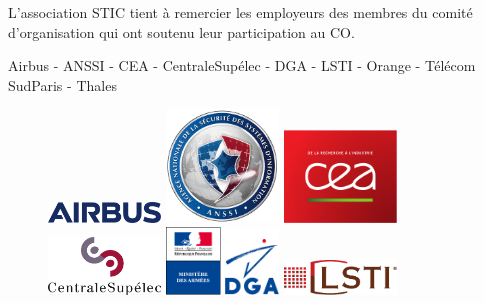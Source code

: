 \noindent
L'association STIC tient à remercier les employeurs des membres du
comité d'organisation qui ont soutenu leur participation au CO.

\begin{center}
Airbus - ANSSI -  CEA - CentraleSup\'elec - DGA - LSTI - Orange - Télécom SudParis - Thales
\end{center}


\begin{figure}[h]
\begin{center}
\parbox{3cm}{\includegraphics[width=3cm]{_frontmatter/logos/airbus}}
\hfill
\parbox{3cm}{\includegraphics[width=3cm]{_frontmatter/logos/anssi}}
\hfill
\parbox{3cm}{\includegraphics[width=3cm]{_frontmatter/logos/cea}}
\end{center}
\vfill
\begin{center}
\parbox{3cm}{\includegraphics[width=3cm]{_frontmatter/logos/centrale-supelec}}
\hfill
\parbox{3cm}{\includegraphics[width=3cm]{_frontmatter/logos/dga}}
\hfill
\parbox{3cm}{\includegraphics[width=3cm]{_frontmatter/logos/lsti}}
\end{center}

\end{figure}
